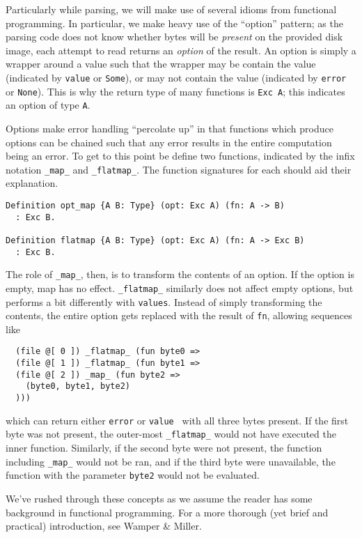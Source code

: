 \documentclass[nocopyrightspace]{sigplanconf}
\begin{document}
Particularly while parsing, we will make use of several idioms from functional
programming. In particular, we make heavy use of the ``option'' pattern; as
the parsing code does not know whether bytes will be {\em present} on the
provided disk image, each attempt to read returns an {\em option} of the
result. An option is simply a wrapper around a value such that the wrapper may
be contain the value (indicated by {\tt value} or {\tt Some}), or may not
contain the value (indicated by {\tt error} or {\tt None}). This is why the
return type of many functions is {\tt Exc A}; this indicates an option of type
{\tt A}.

Options make error handling ``percolate up'' in that functions which produce
options can be chained such that any error results in the entire computation
being an error. To get to this point be define two functions, indicated by the
infix notation {\tt \_map\_} and {\tt \_flatmap\_}. The function signatures
for each should aid their explanation.

\begin{lstlisting}
Definition opt_map {A B: Type} (opt: Exc A) (fn: A -> B)
  : Exc B.

Definition flatmap {A B: Type} (opt: Exc A) (fn: A -> Exc B)
  : Exc B.
\end{lstlisting}

The role of {\tt \_map\_}, then, is to transform the contents of an option. If
the option is empty, map has no effect. {\tt \_flatmap\_} similarly does not
affect empty options, but performs a bit differently with {\tt values}.
Instead of simply transforming the contents, the entire option gets replaced
with the result of {\tt fn}, allowing sequences like

\begin{lstlisting}
  (file @[ 0 ]) _flatmap_ (fun byte0 =>
  (file @[ 1 ]) _flatmap_ (fun byte1 =>
  (file @[ 2 ]) _map_ (fun byte2 =>
    (byte0, byte1, byte2)
  )))
\end{lstlisting}

which can return either {\tt error} or {\tt value } with all three bytes
present. If the first byte was not present, the outer-most {\tt \_flatmap\_}
would not have executed the inner function. Similarly, if the second byte were
not present, the function including {\tt \_map\_} would not be ran, and if the
third byte were unavailable, the function with the parameter {\tt byte2} would
not be evaluated.

We've rushed through these concepts as we assume the reader has some
background in functional programming. For a more thorough (yet brief and
practical) introduction, see Wamper \& Miller\cite{scala}.
\end{document}

